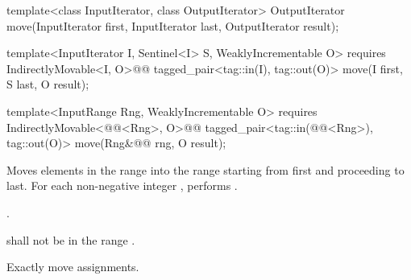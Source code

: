 %
\begin{removedblock}
\begin{itemdecl}
template<class InputIterator, class OutputIterator>
  OutputIterator move(InputIterator first, InputIterator last,
                      OutputIterator result);
\end{itemdecl}
\end{removedblock}
\begin{addedblock}
\begin{itemdecl}
template<InputIterator I, Sentinel<I> S, WeaklyIncrementable O>
  requires IndirectlyMovable<I, O>@\newtxt{()}@
  tagged_pair<tag::in(I), tag::out(O)>
    move(I first, S last, O result);

template<InputRange Rng, WeaklyIncrementable O>
  requires IndirectlyMovable<@@<Rng>, O>@\newtxt{()}@
  tagged_pair<tag::in(@@<Rng>), tag::out(O)>
    move(Rng&@\newtxt{\&}@ rng, O result);
\end{itemdecl}
\end{addedblock}

\begin{itemdescr}
\pnum
\effects
Moves elements in the range 
into the range 
starting from first and proceeding to last.
For each non-negative integer
,
performs
 .

\pnum
\returns
{}.

\pnum
\requires
{}
shall not be in the range
.

\pnum
\complexity
Exactly
move assignments.
\end{itemdescr}

